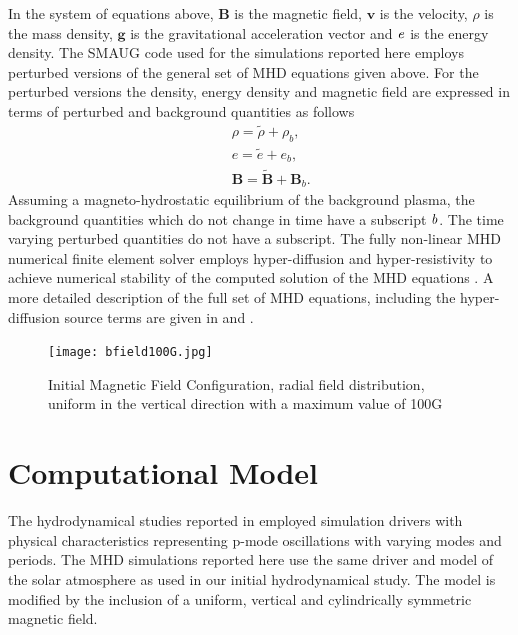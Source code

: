 \documentclass[linenumbers]{aastex63}
\begin{document}
In the system of equations above,  $\mathbf B$ is the magnetic field, $\mathbf v$ is the velocity, $\rho$ is the mass density, $\mathbf g$ is the gravitational acceleration vector  and  $\it{e}$ is the energy density. The SMAUG code used for the simulations reported here employs perturbed versions of the general set of MHD equations given above. For the perturbed versions the density,  energy density and magnetic field are expressed in terms of perturbed and background quantities as follows
\begin{eqnarray}
&& \rho = \tilde{\rho}+\rho_b, \nonumber \\
&& e = \tilde{e}+e_b,  \nonumber \\
&& {\mathbf B} = \tilde{\mathbf B}+{\mathbf B}_b.  \nonumber 
\end{eqnarray}
Assuming a magneto-hydrostatic equilibrium of the background plasma, the background quantities which do not change in time have a subscript $\it{b}$. The time varying perturbed quantities do not have a subscript. The fully non-linear MHD numerical finite element solver employs hyper-diffusion and hyper-resistivity to achieve numerical stability of the computed solution of the MHD equations \citet{Caunt2001}. A more detailed description of the full set of MHD equations, including the hyper-diffusion source terms are given in \citet{Griffiths2015} and \citet{Shelyag2008}.

\begin{figure}[h]\label{inimagfieldplot}
\centering
\texttt{[image: bfield100G.jpg]}
\caption{Initial Magnetic Field Configuration, radial field distribution, uniform in the vertical direction with a maximum value of 100G }
\end{figure}

\break

\section{Computational Model}
The hydrodynamical studies reported in  \citet{Griffiths2018b} employed simulation drivers with physical characteristics representing p-mode oscillations with varying modes and periods. The MHD simulations reported here use the same driver and model of the solar atmosphere as used in our initial hydrodynamical study. The model is modified by the inclusion of a uniform, vertical and cylindrically symmetric magnetic field. 
\end{document}
